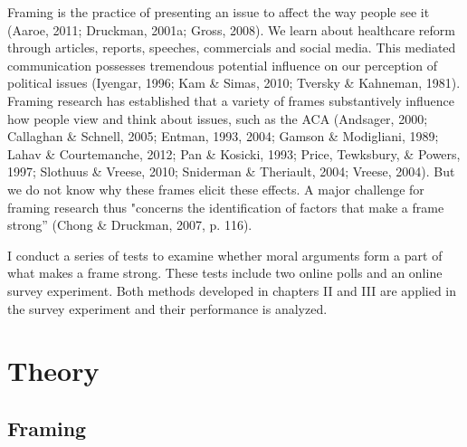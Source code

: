 \documentclass[12pt,econ]{sources/authesis}
\begin{document}
Framing is the practice of presenting an issue to affect the way people see it (Aaroe, 2011; Druckman, 2001a; Gross, 2008). We learn about healthcare reform through articles, reports, speeches, commercials and social media. This mediated communication possesses tremendous potential influence on our perception of political issues (Iyengar, 1996; Kam \& Simas, 2010; Tversky \& Kahneman, 1981). Framing research has established that a variety of frames substantively influence how people view and think about issues, such as the ACA (Andsager, 2000; Callaghan \& Schnell, 2005; Entman, 1993, 2004; Gamson \& Modigliani, 1989; Lahav \& Courtemanche, 2012; Pan \& Kosicki, 1993; Price, Tewksbury, \& Powers, 1997; Slothuus \& Vreese, 2010; Sniderman \& Theriault, 2004; Vreese, 2004). But we do not know why these frames elicit these effects. A major challenge for framing research thus "concerns the identification of factors that make a frame strong'' (Chong \& Druckman, 2007, p. 116).

I conduct a series of tests to examine whether moral arguments form a part of what makes a frame strong. These tests include two online polls and an online survey experiment. Both methods developed in chapters II and III are applied in the survey experiment and their performance is analyzed.

\hypertarget{framing-theory}{%
\section{Theory}\label{framing-theory}}

\hypertarget{framing-theory-framing}{%
\subsection{Framing}\label{framing-theory-framing}}
\end{document}
